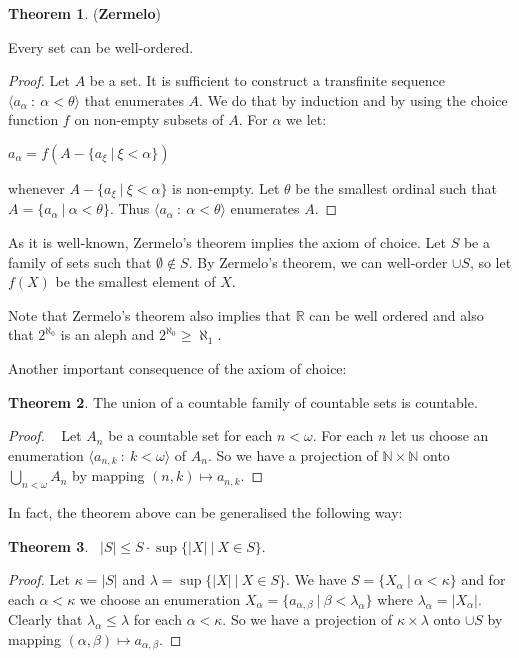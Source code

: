 \documentclass[8pt]{article}
\theoremstyle{definition}
\theoremstyle{definition}
\newtheorem{theorem}{Theorem}[section]
\theoremstyle{definition}
\theoremstyle{definition}
\theoremstyle{definition}
\theoremstyle{definition}
\theoremstyle{definition}
\theoremstyle{definition}
\theoremstyle{definition}
\theoremstyle{definition}
\theoremstyle{definition}
\theoremstyle{definition}
\theoremstyle{definition}
\theoremstyle{definition}
\theoremstyle{question}
\begin{document}
\begin{theorem}{({\bf Zermelo})}

  Every set can be well-ordered.
\end{theorem}

\begin{proof}
  Let $A$ be a set. It is sufficient to construct a transfinite sequence 
  $\langle a_{\alpha} \: : \: \alpha < \theta \rangle$ that enumerates $A$. We do that by induction and by using
  the choice function $f$ on non-empty subsets of $A$. For $\alpha$ we let:
  \begin{center}
    $a_{\alpha} = f (A - \{ a_{\xi} \: | \: \xi < \alpha \})$
  \end{center}
  whenever $A - \{ a_{\xi} \: | \: \xi < \alpha \}$ is non-empty. 
  Let $\theta$ be the smallest ordinal such that $A = \{ a_{\alpha} \: | \: \alpha < \theta \}$.
  Thus $\langle a_{\alpha} \: : \: \alpha < \theta \rangle$ enumerates $A$.
\end{proof}

As it is well-known, Zermelo's theorem implies the axiom of choice.
Let $S$ be a family of sets such that $\emptyset \notin S$.
By Zermelo's theorem, we can well-order $\cup S$, so let $f(X)$ be the smallest element of $X$.

Note that Zermelo's theorem also implies that $\mathbb{R}$ can be well ordered and also that $2^{\aleph_0}$ is an aleph
and $2^{\aleph_0} \geq \aleph_1$.

Another important consequence of the axiom of choice:
\begin{theorem}
  The union of a countable family of countable sets is countable.
\end{theorem}

\begin{proof}~\label{countableunion}
  Let $A_n$ be a countable set for each $n < \omega$. For each $n$ let us choose an enumeration 
  $\langle a_{n, k} \: : \: k < \omega \rangle$ of $A_n$. So we have a projection of $\mathbb{N} \times \mathbb{N}$ onto
  $\bigcup \limits_{n < \omega} A_n$ by mapping $(n, k) \mapsto a_{n,k}$.
\end{proof}

In fact, the theorem above can be generalised the following way:
\begin{theorem}~\label{union}
  $|S| \leq S \cdot \sup \{ |X| \: | \: X \in S \}$.
\end{theorem}

\begin{proof}
  Let $\kappa = |S|$ and $\lambda = \sup \{ |X| \: | \: X \in S \}$.
  We have $S = \{ X_{\alpha} \: | \: \alpha < \kappa \}$ and for each $\alpha < \kappa$ we choose an 
  enumeration $X_{\alpha} = \{ a_{\alpha, \beta} \: | \: \beta < \lambda_{\alpha} \}$ where $\lambda_{\alpha} = |X_{\alpha}|$.
  Clearly that $\lambda_{\alpha} \leq \lambda$ for each $\alpha < \kappa$.
  So we have a projection of $\kappa \times \lambda$ onto $\cup S$ by mapping $(\alpha, \beta) \mapsto a_{\alpha, \beta}$.
\end{proof}
\end{document}
